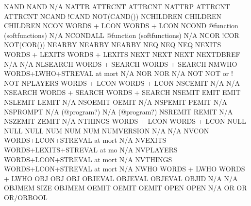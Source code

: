 \documentclass[letterpaper,10pt,english]{sphinxmanual}
\begin{document}
\begin{description}
NAND                    NAND                         N/A
NATTR                   ATTRCNT                      ATTRCNT
NATTRP                  ATTRCNT                      ATTRCNT
NCAND                   !CAND                        NOT(CAND())
NCHILDREN               CHILDREN                     CHILDREN
NCON                    WORDS + LCON                 WORDS + LCON
NCOND                   @function (softfunctions)    N/A
NCONDALL                @function (softfunctions)    N/A
NCOR                    !COR                         NOT(COR())
NEARBY                  NEARBY                       NEARBY
NEQ                     NEQ                          NEQ
NEXITS                  WORDS + LEXITS               WORDS + LEXITS
NEXT                    NEXT                         NEXT
NEXTDBREF               N/A                          N/A
NLSEARCH                WORDS + SEARCH               WORDS + SEARCH
NMWHO                   WORDS+LWHO+STREVAL at mort   N/A
NOR                     NOR                          N/A
NOT                     NOT or !                     NOT
NPLAYERS                WORDS + LCON                 WORDS + LCON
NSCEMIT                 N/A                          N/A
NSEARCH                 WORDS + SEARCH               WORDS + SEARCH
NSEMIT                  EMIT                         EMIT
NSLEMIT                 LEMIT                        N/A
NSOEMIT                 OEMIT                        N/A
NSPEMIT                 PEMIT                        N/A
NSPROMPT                N/A (@program?)              N/A (@program?)
NSREMIT                 REMIT                        N/A
NSZEMIT                 ZEMIT                        N/A
NTHINGS                 WORDS + LCON                 WORDS + LCON
NULL                    NULL                         NULL
NUM                     NUM                          NUM
NUMVERSION              N/A                          N/A
NVCON                   WORDS+LCON+STREVAL at mort   N/A
NVEXITS                 WORDS+LEXITS+STREVAL at mo   N/A
NVPLAYERS               WORDS+LCON+STREVAL at mort   N/A
NVTHINGS                WORDS+LCON+STREVAL at mort   N/A
NWHO                    WORDS + LWHO                 WORDS + LWHO
OBJ                     OBJ                          OBJ
OBJEVAL                 OBJEVAL                      OBJEVAL
OBJID                   N/A                          N/A
OBJMEM                  SIZE                         OBJMEM
OEMIT                   OEMIT                        OEMIT
OPEN                    OPEN                         N/A
OR                      OR                           OR/ORBOOL

\end{description}
\end{document}
